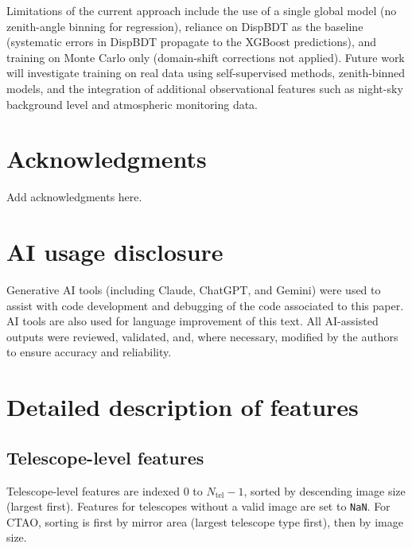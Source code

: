 \documentclass[12pt]{article}
\begin{document}
Limitations of the current approach include the use of a single global model
(no zenith-angle binning for regression), reliance on DispBDT as the baseline
(systematic errors in DispBDT propagate to the XGBoost predictions),
and training on Monte Carlo only (domain-shift corrections not applied).
Future work will investigate training on real data using self-supervised methods,
zenith-binned models, and the integration of additional observational features
such as night-sky background level and atmospheric monitoring data.

\section*{Acknowledgments}

Add acknowledgments here.


\section*{AI usage disclosure}

Generative AI tools (including Claude, ChatGPT, and Gemini) were used to assist
with code development and debugging of the code associated to this paper.
AI tools are also used for language improvement of this text.
All AI-assisted outputs were reviewed, validated, and, where necessary,
modified by the authors to ensure accuracy and reliability.




\appendix

\section{Detailed description of features}
\label{sec:appendix_features}

\subsection{Telescope-level features}

Telescope-level features are indexed 0 to $N_\mathrm{tel}-1$, sorted by descending
image size (largest first). Features for telescopes without a valid image are set to \texttt{NaN}.
For CTAO, sorting is first by mirror area (largest telescope type first), then by image size.
\end{document}
